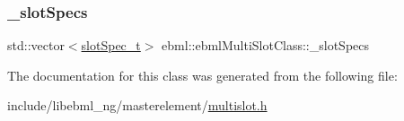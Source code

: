 \mbox{\label{classebml_1_1ebmlMultiSlotClass_acf45df8a12023df6aca62e56b0048c46}} 
\subsubsection{\texorpdfstring{\+\_\+slot\+Specs}{\_slotSpecs}}
{\footnotesize\ttfamily std\+::vector$<$\mbox{\hyperlink{classebml_1_1slotSpec__t}{slot\+Spec\+\_\+t}}$>$ ebml\+::ebml\+Multi\+Slot\+Class\+::\+\_\+slot\+Specs\hspace{0.3cm}{\ttfamily [protected]}}



The documentation for this class was generated from the following file\+:\begin{DoxyCompactItemize}
\item 
include/libebml\+\_\+ng/masterelement/\mbox{\hyperlink{multislot_8h}{multislot.\+h}}\end{DoxyCompactItemize}
